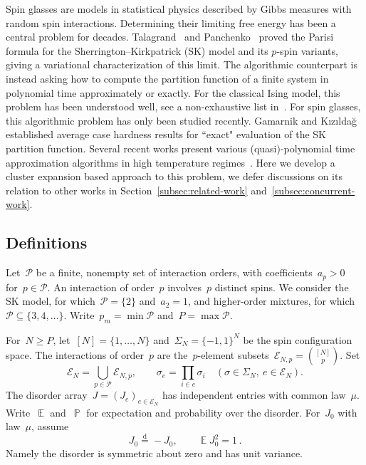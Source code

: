 \documentclass[letterpaper,11pt,reqno]{amsart}
\renewcommand{\geq}{\geqslant}
\DeclareMathOperator{\E}{\mathds{E}}
\DeclareMathOperator{\pr}{\mathds{P}}
\begin{document}
Spin glasses are models in statistical physics described by Gibbs measures with random spin interactions. Determining their limiting free energy has been a central problem for decades. Talagrand~\cite{Tal06} and Panchenko~\cite{panchenko2014parisi} proved the Parisi formula for the Sherrington--Kirkpatrick (SK) model and its $p$-spin variants, giving a variational characterization of this limit. The algorithmic counterpart is instead asking how to compute the partition function of a finite system in polynomial time approximately or exactly. For the classical Ising model, this problem has been understood well, see a non-exhaustive list in~\cites{JS93,LLY13,PR17,LSS19}. For spin glasses, this algorithmic problem has only been studied recently. Gamarnik and K{\i}z{\i}lda{\u{g}}~\cite{GK21} established average case hardness results for ``exact" evaluation of the SK partition function. Several recent works present various (quasi)-polynomial time approximation algorithms in high temperature regimes~\cites{BHL25,HLMM26,SZ26,HLY26}. Here we develop a cluster expansion based approach to this problem, we defer discussions on its relation to other works in Section~\ref{subsec:related-work} and~\ref{subsec:concurrent-work}.


\subsection{Definitions}\label{subsec:model}

Let~$\mathcal P$ be a finite, nonempty set of interaction orders, with coefficients~\mbox{$a_p>0$} for~$p\in\mathcal P$. An interaction of order~$p$ involves~$p$ distinct spins. We consider the SK model, for which~$\mathcal P=\{2\}$ and~$a_2=1$, and higher-order mixtures, for which~$\mathcal P\subseteq\{3,4,\ldots\}$. Write~\mbox{$p_m=\min\mathcal P$} and~\mbox{$P=\max\mathcal P$}.

For~$N\geq P$, let~$[N]=\{1,\ldots,N\}$ and~$\Sigma_N=\{-1,1\}^N$ be the spin configuration space. The interactions of order~$p$ are the~$p$-element subsets~$\mathcal E_{N,p}=\binom{[N]}p$. Set
\begin{equation*}
\mathcal E_N=\bigcup_{p\in\mathcal P}\mathcal E_{N,p},\qquad
\sigma_e=\prod_{i\in e}\sigma_i\quad(\sigma\in\Sigma_N,\ e\in\mathcal E_N).
\end{equation*}
The disorder array~$J=(J_e)_{e\in\mathcal E_N}$ has independent entries with common law~$\mu$. Write~$\E$ and~$\pr$ for expectation and probability over the disorder. For~$J_0$ with law~$\mu$, assume
\begin{equation}\label{eq:disorder}
J_0\overset{\mathrm d}=-J_0,\qquad \E J_0^2=1\,.
\end{equation}
Namely the disorder is symmetric about zero and has unit variance.
\end{document}
